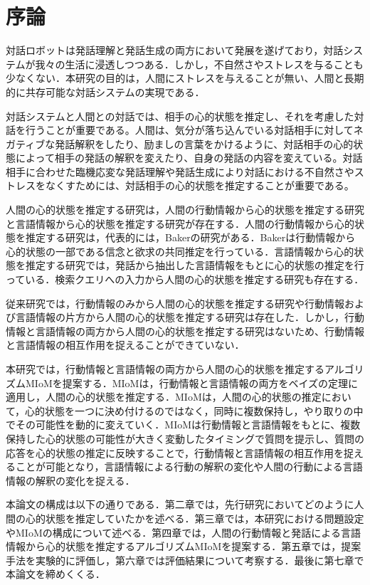 \chapter{序論}

\par
対話ロボットは発話理解と発話生成の両方において発展を遂げており，対話システムが我々の生活に浸透しつつある．しかし，不自然さやストレスを与ることも少なくない．本研究の目的は，人間にストレスを与えることが無い、人間と長期的に共存可能な対話システムの実現である．

\par
対話システムと人間との対話では、相手の心的状態を推定し、それを考慮した対話を行うことが重要である。人間は、気分が落ち込んでいる対話相手に対してネガティブな発話解釈をしたり、励ましの言葉をかけるように、対話相手の心的状態によって相手の発話の解釈を変えたり、自身の発話の内容を変えている。対話相手に合わせた臨機応変な発話理解や発話生成により対話における不自然さやストレスをなくすためには、対話相手の心的状態を推定することが重要である。

\par
人間の心的状態を推定する研究は，人間の行動情報から心的状態を推定する研究と言語情報から心的状態を推定する研究が存在する．人間の行動情報から心的状態を推定する研究は，代表的には，Bakerの研究がある．Bakerは行動情報から心的状態の一部である信念と欲求の共同推定を行っている．言語情報から心的状態を推定する研究では，発話から抽出した言語情報をもとに心的状態の推定を行っている．検索クエリへの入力から人間の心的状態を推定する研究も存在する．

\par
従来研究では，行動情報のみから人間の心的状態を推定する研究や行動情報および言語情報の片方から人間の心的状態を推定する研究は存在した．しかし，行動情報と言語情報の両方から人間の心的状態を推定する研究はないため、行動情報と言語情報の相互作用を捉えることができていない．

\par
本研究では，行動情報と言語情報の両方から人間の心的状態を推定するアルゴリズムMIoMを提案する．MIoMは，行動情報と言語情報の両方をベイズの定理に適用し，人間の心的状態を推定する．MIoMは，人間の心的状態の推定において，心的状態を一つに決め付けるのではなく，同時に複数保持し，やり取りの中でその可能性を動的に変えていく．MIoMは行動情報と言語情報をもとに、複数保持した心的状態の可能性が大きく変動したタイミングで質問を提示し、質問の応答を心的状態の推定に反映することで，行動情報と言語情報の相互作用を捉えることが可能となり，言語情報による行動の解釈の変化や人間の行動による言語情報の解釈の変化を捉える．

\par
本論文の構成は以下の通りである．第二章では，先行研究においてどのように人間の心的状態を推定していたかを述べる．第三章では，本研究における問題設定やMIoMの構成について述べる．第四章では，人間の行動情報と発話による言語情報から心的状態を推定するアルゴリズムMIoMを提案する．第五章では，提案手法を実験的に評価し，第六章では評価結果について考察する．最後に第七章で本論文を締めくくる．
